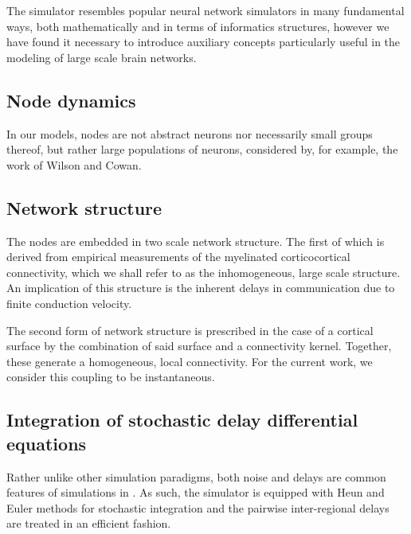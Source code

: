 The \TVB simulator resembles popular neural network simulators in 
many fundamental ways, both mathematically and in terms of informatics 
structures, however we have found it necessary to introduce auxiliary
concepts particularly useful in the modeling of large scale brain 
networks.

\subsection{Node dynamics}

	In our models, nodes are not abstract neurons nor necessarily 
	small groups thereof, but rather large populations of neurons, considered
	by, for example, the work of Wilson and Cowan. 


\subsection{Network structure}
	
	The nodes are embedded in two scale network structure. The first of which
	is derived from empirical measurements of the myelinated corticocortical
	connectivity, which we shall refer to as the inhomogeneous, large scale
	structure. An implication of this structure is the inherent delays in 
	communication due to finite conduction velocity.

	The second form of network structure is prescribed in the case of a 
	cortical surface by the combination of said surface and a connectivity
	kernel. Together, these generate a homogeneous, local connectivity. 
	For the current work, we consider this coupling to be instantaneous.


\subsection{Integration of stochastic delay differential equations}

	Rather unlike other simulation paradigms, both noise and delays are
	common features of simulations in \TVB. As such, the simulator is equipped
	with Heun and Euler methods for stochastic integration and the pairwise
	inter-regional delays are treated in an efficient fashion. 



